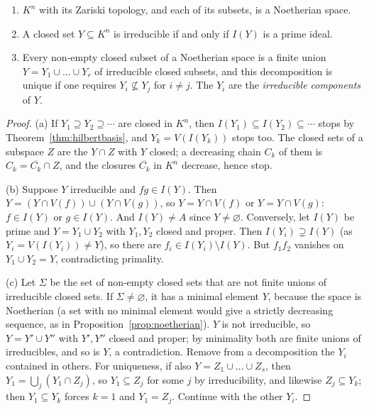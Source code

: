 \begin{proposition}\label{prop:components}
\leavevmode
\begin{enumerate}[label=(\alph*)]
\item $K^n$ with its Zariski topology, and each of its subsets, is a Noetherian space.
\item A closed set $Y\subseteq K^n$ is irreducible if and only if $I(Y)$ is a prime ideal.
\item Every non-empty closed subset of a Noetherian space is a finite union $Y=Y_1\cup\dots\cup Y_r$ of irreducible closed subsets, and this decomposition is unique if one requires $Y_i\not\subseteq Y_j$ for $i\ne j$. The
$Y_i$ are the \emph{irreducible components} of $Y$.
\end{enumerate}
\end{proposition}

\begin{proof}
(a) If $Y_1\supseteq Y_2\supseteq\cdots$ are closed in $K^n$, then $I(Y_1)\subseteq I(Y_2)\subseteq\cdots$ stops by Theorem~\ref{thm:hilbertbasis}, and $Y_k=V(I(Y_k))$ stops too. The closed sets of a subspace $Z$ are the
$Y\cap Z$ with $Y$ closed; a decreasing chain $C_k$ of them is $C_k=\overline{C_k}\cap Z$, and the closures $\overline{C_k}$ in $K^n$ decrease, hence stop.

(b) Suppose $Y$ irreducible and $fg\in I(Y)$. Then $Y=(Y\cap V(f))\cup(Y\cap V(g))$, so $Y=Y\cap V(f)$ or $Y=Y\cap V(g)$: $f\in I(Y)$ or $g\in I(Y)$. And $I(Y)\ne A$ since $Y\ne\varnothing$. Conversely, let $I(Y)$ be prime and $Y=Y_1\cup Y_2$ with
$Y_1,Y_2$ closed and proper. Then $I(Y_i)\supsetneq I(Y)$ (as $Y_i=V(I(Y_i))\ne Y$), so there are $f_i\in I(Y_i)\setminus I(Y)$. But $f_1f_2$ vanishes on $Y_1\cup Y_2=Y$, contradicting primality.

(c) Let $\Sigma$ be the set of non-empty closed sets that are not finite unions of irreducible closed sets. If $\Sigma\neq\varnothing$, it has a minimal element $Y$, because the space is Noetherian (a set with no minimal element
would give a strictly decreasing sequence, as in Proposition~\ref{prop:noetherian}). $Y$ is not irreducible, so $Y=Y'\cup Y''$ with $Y',Y''$ closed and proper; by minimality both are finite unions of irreducibles, and so is $Y$, a
contradiction. Remove from a decomposition the $Y_i$ contained in others. For uniqueness, if also $Y=Z_1\cup\dots\cup Z_s$, then $Y_1=\bigcup_j(Y_1\cap Z_j)$, so $Y_1\subseteq Z_j$ for some $j$ by irreducibility, and likewise
$Z_j\subseteq Y_k$; then $Y_1\subseteq Y_k$ forces $k=1$ and $Y_1=Z_j$. Continue with the other $Y_i$.
\end{proof}

